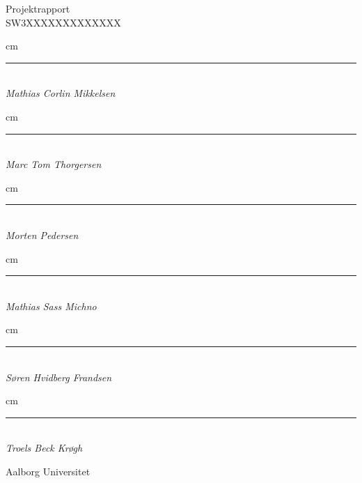   \begin{center}
    {\large
      Projektrapport%
    }\\
    \vspace{0.2cm}
    {\Large
      SW3XXXXXXXXXXXXX%
    }
		\vspace{2 cm}
		\begin{flushleft}
			 cm
			\Large
      \begin{minipage}{0.45\textwidth}
      \centering
      \rule{\textwidth}{0.5pt}\\
			\textit{Mathias Corlin Mikkelsen}
      \end{minipage}
		\end{flushleft}
		\begin{flushright}
			\hangindent=2 cm
			\Large
      \begin{minipage}{0.45\textwidth}
      \centering
      \rule{\textwidth}{0.5pt}\\
			\textit{Marc Tom Thorgersen}
		  \end{minipage}
    \end{flushright}
		\begin{flushleft}
			\parindent=2 cm
			\Large
      \begin{minipage}{0.45\textwidth}
      \centering
      \rule{\textwidth}{0.5pt}\\
			\textit{Morten Pedersen}
		  \end{minipage}
    \end{flushleft}
		\begin{flushright}
			 cm
			\Large
      \begin{minipage}{0.45\textwidth}
      \centering
      \rule{\textwidth}{0.5pt}\\
			\textit{Mathias Sass Michno}
		  \end{minipage}
    \end{flushright}
		\begin{flushleft}
			\hangindent=2 cm
			\Large
      \begin{minipage}{0.45\textwidth}
      \centering
      \rule{\textwidth}{0.5pt}\\
			\textit{Søren Hvidberg Frandsen}
		  \end{minipage}
    \end{flushleft}
		\begin{flushright}
			\hangindent=2 cm
			\Large
      \begin{minipage}{0.45\textwidth}
      \centering
      \rule{\textwidth}{0.5pt}\\
			\textit{Troels Beck Krøgh}
		  \end{minipage}
    \end{flushright}

  \end{center}
  \vfill
  \begin{center}
  Aalborg Universitet\\
  \end{center}
